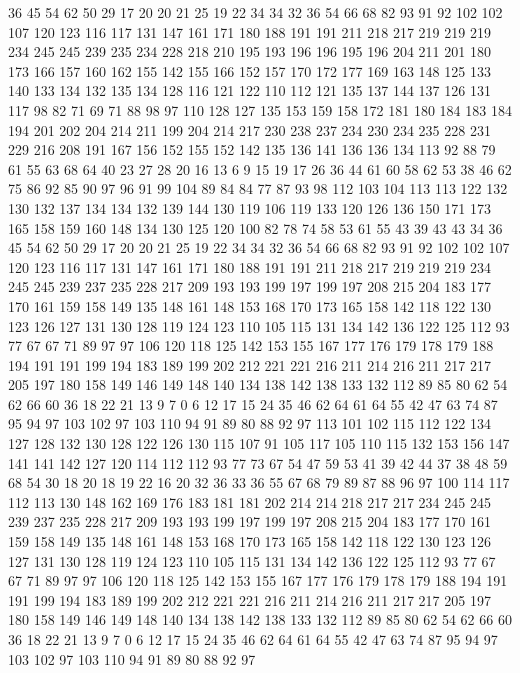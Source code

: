 36 45 54 62 50 29 17 20 20 21 25 19 22 34 34 32 36 54 66 68
82 93 91 92 102 102 107 120 123 116 117 131 147 161 171 180 188 191 191 211
218 217 219 219 219 234 245 245 239 235 234 228 218 210 195 193 196 196 195 196
204 211 201 180 173 166 157 160 162 155 142 155 166 152 157 170 172 177 169 163
148 125 133 140 133 134 132 135 134 128 116 121 122 110 112 121 135 137 144 137
126 131 117 98 82 71 69 71 88 98 97 110 128 127 135 153 159 158 172 181
180 184 183 184 194 201 202 204 214 211 199 204 214 217 230 238 237 234 230 234
235 228 231 229 216 208 191 167 156 152 155 152 142 135 136 141 136 136 134 113
92 88 79 61 55 63 68 64 40 23 27 28 20 16 13 6 9 15 19 17
26 36 44 61 60 58 62 53 38 46 62 75 86 92 85 90 97 96 91 99
104 89 84 84 77 87 93 98 112 103 104 113 113 122 132 130 132 137 134 134
132 139 144 130 119 106 119 133 120 126 136 150 171 173 165 158 159 160 148 134
130 125 120 100 82 78 74 58 53 61 55 43 39 43 43 34 36 45 54 62
50 29 17 20 20 21 25 19 22 34 34 32 36 54 66 68 82 93 91 92
102 102 107 120 123 116 117 131 147 161 171 180 188 191 191 211 218 217 219 219
219 234 245 245 239 237 235 228 217 209 193 193 199 197 199 197 208 215 204 183
177 170 161 159 158 149 135 148 161 148 153 168 170 173 165 158 142 118 122 130
123 126 127 131 130 128 119 124 123 110 105 115 131 134 142 136 122 125 112 93
77 67 67 71 89 97 97 106 120 118 125 142 153 155 167 177 176 179 178 179
188 194 191 191 199 194 183 189 199 202 212 221 221 216 211 214 216 211 217 217
205 197 180 158 149 146 149 148 140 134 138 142 138 133 132 112 89 85 80 62
54 62 66 60 36 18 22 21 13 9 7 0 6 12 17 15 24 35 46 62
64 61 64 55 42 47 63 74 87 95 94 97 103 102 97 103 110 94 91 89
80 88 92 97 113 101 102 115 112 122 134 127 128 132 130 128 122 126 130 115
107 91 105 117 105 110 115 132 153 156 147 141 141 142 127 120 114 112 112 93
77 73 67 54 47 59 53 41 39 42 44 37 38 48 59 68 54 30 18 20
18 19 22 16 20 32 36 33 36 55 67 68 79 89 87 88 96 97 100 114
117 112 113 130 148 162 169 176 183 181 181 202 214 214 218 217 217 234 245 245
239 237 235 228 217 209 193 193 199 197 199 197 208 215 204 183 177 170 161 159
158 149 135 148 161 148 153 168 170 173 165 158 142 118 122 130 123 126 127 131
130 128 119 124 123 110 105 115 131 134 142 136 122 125 112 93 77 67 67 71
89 97 97 106 120 118 125 142 153 155 167 177 176 179 178 179 188 194 191 191
199 194 183 189 199 202 212 221 221 216 211 214 216 211 217 217 205 197 180 158
149 146 149 148 140 134 138 142 138 133 132 112 89 85 80 62 54 62 66 60
36 18 22 21 13 9 7 0 6 12 17 15 24 35 46 62 64 61 64 55
42 47 63 74 87 95 94 97 103 102 97 103 110 94 91 89 80 88 92 97
